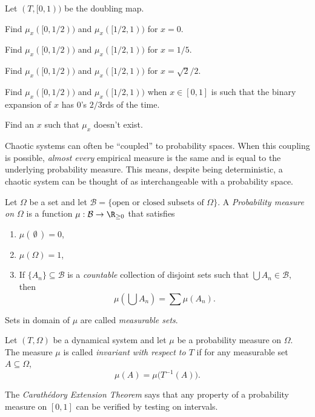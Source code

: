 	\question
	Let $(T,[0,1))$ be the doubling map.
	\begin{parts}
		\item Find $\mu_x([0,1/2))$ and $\mu_x([1/2,1))$ for $x=0$.
		\item Find $\mu_x([0,1/2))$ and $\mu_x([1/2,1))$ for $x=1/5$.
		\item Find $\mu_x([0,1/2))$ and $\mu_x([1/2,1))$ for $x=\sqrt{2}/2$.
		\item Find $\mu_x([0,1/2))$ and $\mu_x([1/2,1))$ when $x\in[0,1]$ is such that the binary expansion
			of $x$ has $0$'s $2/3$rds of the time.
		\item Find an $x$ such that $\mu_x$ doesn't exist.
	\end{parts}

	\newpage
	Chaotic systems can often be ``coupled'' to probability spaces. When this coupling is possible,
	\emph{almost every} empirical measure is the same and is equal to the underlying probability measure.
	This means, despite being deterministic, a chaotic system can be thought of as interchangeable with a
	probability space.
	
	\begin{definition}
		Let $\Omega$ be a set and let $\mathcal B=\{\text{open or closed subsets of $\Omega$}\}$. A
		\emph{Probability measure on $\Omega$} is a function $\mu:\mathcal B\to \R_{\geq 0}$ that satisfies
		\begin{enumerate}
			\item $\mu(\,\emptyset\,)=0$,
			\item $\mu(\Omega)=1$,
			\item If $\{A_n\}\subseteq \mathcal B$ is a {\itshape countable} collection of disjoint
				sets such that $\bigcup A_n\in \mathcal B$, then \[\mu\left(\bigcup A_n\right)=\sum \mu(A_n).\]
		\end{enumerate}
		Sets in domain of $\mu$ are called \emph{measurable sets}.
	\end{definition}
	\begin{definition}
		Let $(T,\Omega)$ be a dynamical system and let $\mu$ be a probability measure on $\Omega$. The
		measure $\mu$ is called \emph{invariant with respect to $T$} if for any measurable set $A\subseteq \Omega$,
		\[
			\mu(A) = \mu\Big(T^{-1}(A)\Big).
		\]
	\end{definition}
	The \emph{Carath\'edory Extension Theorem} says that any property of a probability measure on $[0,1]$ can
	be verified by testing on intervals.

